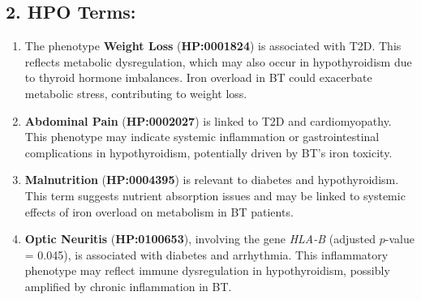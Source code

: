 \subsection*{2. HPO Terms: }
\begin{enumerate}
    \item The phenotype \textbf{Weight Loss} (\textbf{HP:0001824}) is associated with T2D. This reflects metabolic dysregulation, which may also occur in hypothyroidism due to thyroid hormone imbalances. Iron overload in BT could exacerbate metabolic stress, contributing to weight loss.
    \item \textbf{Abdominal Pain} (\textbf{HP:0002027}) is linked to T2D and cardiomyopathy. This phenotype may indicate systemic inflammation or gastrointestinal complications in hypothyroidism, potentially driven by BT's iron toxicity.
    \item \textbf{Malnutrition} (\textbf{HP:0004395}) is relevant to diabetes and hypothyroidism. This term suggests nutrient absorption issues and may be linked to systemic effects of iron overload on metabolism in BT patients.
    \item \textbf{Optic Neuritis} (\textbf{HP:0100653}), involving the gene \textit{HLA-B} (adjusted $p$-value = 0.045), is associated with diabetes and arrhythmia. This inflammatory phenotype may reflect immune dysregulation in hypothyroidism, possibly amplified by chronic inflammation in BT.
\end{enumerate}


